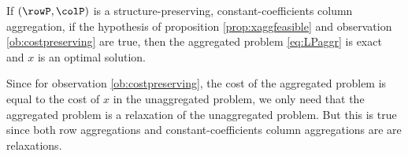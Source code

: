 \begin{proposition}
If \((\rowP,\colP)\) is a structure-preserving, constant-coefficients column aggregation,
if the hypothesis of proposition \ref{prop:xaggfeasible} and observation \ref{ob:costpreserving} are true, then the aggregated problem \eqref{eq:LPaggr} is exact and \(x\) is an optimal solution.
\end{proposition}

   Since for observation \ref{ob:costpreserving}, the cost of the aggregated problem is equal to the cost of \(x\) in the unaggregated problem, we only need that the aggregated problem is a relaxation of the unaggregated problem.
   But this is true since both row aggregations and constant-coefficients column aggregations are are relaxations.












